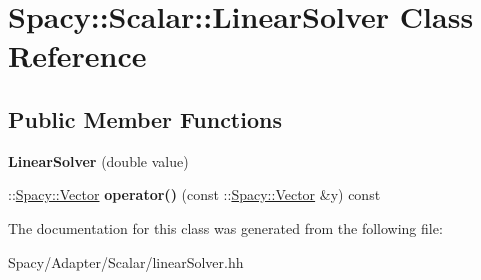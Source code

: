 \hypertarget{classSpacy_1_1Scalar_1_1LinearSolver}{}\section{Spacy\+:\+:Scalar\+:\+:Linear\+Solver Class Reference}
\label{classSpacy_1_1Scalar_1_1LinearSolver}
\subsection*{Public Member Functions}
\begin{DoxyCompactItemize}
\item 
\hypertarget{classSpacy_1_1Scalar_1_1LinearSolver_ae89ae320952e579bcfce487e73ea5294}{}{\bfseries Linear\+Solver} (double value)\label{classSpacy_1_1Scalar_1_1LinearSolver_ae89ae320952e579bcfce487e73ea5294}

\item 
\hypertarget{classSpacy_1_1Scalar_1_1LinearSolver_a313320289288973c0de96e0d441573be}{}\+::\hyperlink{classSpacy_1_1Vector}{Spacy\+::\+Vector} {\bfseries operator()} (const \+::\hyperlink{classSpacy_1_1Vector}{Spacy\+::\+Vector} \&y) const \label{classSpacy_1_1Scalar_1_1LinearSolver_a313320289288973c0de96e0d441573be}

\end{DoxyCompactItemize}


The documentation for this class was generated from the following file\+:\begin{DoxyCompactItemize}
\item 
Spacy/\+Adapter/\+Scalar/linear\+Solver.\+hh\end{DoxyCompactItemize}
